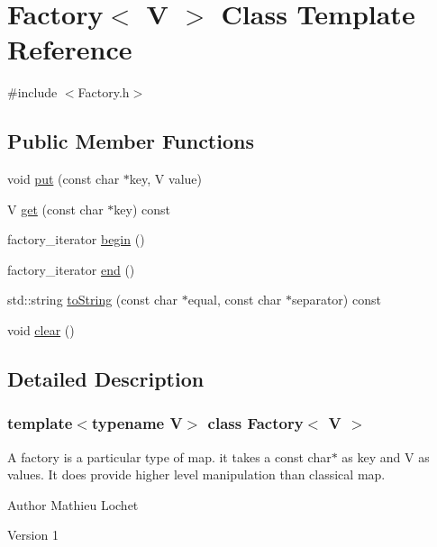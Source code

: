 \hypertarget{classFactory}{}\section{Factory$<$ V $>$ Class Template Reference}
\label{classFactory}


{\ttfamily \#include $<$Factory.\+h$>$}

\subsection*{Public Member Functions}
\begin{DoxyCompactItemize}
\item 
void \mbox{\hyperlink{classFactory_adeaad06fb30141096cc92f98cc3dffa1}{put}} (const char $\ast$key, V value)
\item 
V \mbox{\hyperlink{classFactory_a8a13e5edc3e0c102a1e2fb85047e99d8}{get}} (const char $\ast$key) const
\item 
factory\+\_\+iterator \mbox{\hyperlink{classFactory_a3ea08050cb96078e9d9624de4220d517}{begin}} ()
\item 
factory\+\_\+iterator \mbox{\hyperlink{classFactory_a8b583450f222b426ba2212365f49638f}{end}} ()
\item 
std\+::string \mbox{\hyperlink{classFactory_a3bb49eea6ec1a75fbe7a8c601f27917d}{to\+String}} (const char $\ast$equal, const char $\ast$separator) const
\item 
void \mbox{\hyperlink{classFactory_ab807366d94004ad2b1c88d5c95de1942}{clear}} ()
\end{DoxyCompactItemize}


\subsection{Detailed Description}
\subsubsection*{template$<$typename V$>$\newline
class Factory$<$ V $>$}

A factory is a particular type of map. it takes a const char$\ast$ as key and V as values. It does provide higher level manipulation than classical map.

\begin{DoxyAuthor}{Author}
Mathieu Lochet 
\end{DoxyAuthor}
\begin{DoxyVersion}{Version}
1 
\end{DoxyVersion}


